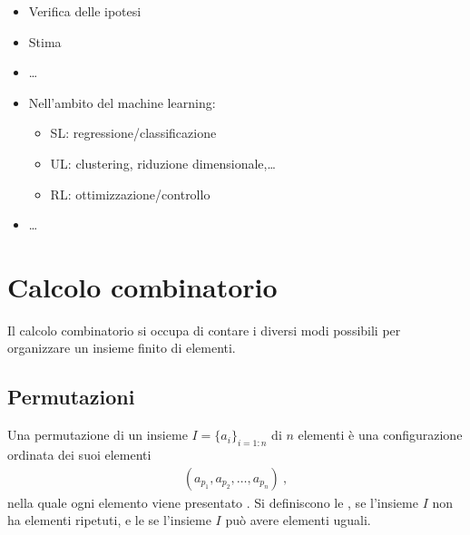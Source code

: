 \documentclass[letterpaper,10pt,italian]{jupyterBook}
\begin{document}
\sphinxAtStartPar
{}
\begin{itemize}
\item {} 
\sphinxAtStartPar
Verifica delle ipotesi

\item {} 
\sphinxAtStartPar
Stima

\item {} 
\sphinxAtStartPar
…

\item {} 
\sphinxAtStartPar
Nell’ambito del machine learning:
\begin{itemize}
\item {} 
\sphinxAtStartPar
SL: regressione/classificazione

\item {} 
\sphinxAtStartPar
UL: clustering, riduzione dimensionale,…

\item {} 
\sphinxAtStartPar
RL: ottimizzazione/controllo

\end{itemize}

\item {} 
\sphinxAtStartPar
…

\end{itemize}

\sphinxstepscope


\section{Calcolo combinatorio}
\label{\detokenize{ch/statistics/combinatorics:calcolo-combinatorio}}\label{\detokenize{ch/statistics/combinatorics:math-hs-statistics-combinatorics}}\label{\detokenize{ch/statistics/combinatorics::doc}}
\sphinxAtStartPar
Il calcolo combinatorio si occupa di contare i diversi modi possibili per organizzare un insieme finito di elementi.


\subsection{Permutazioni}
\label{\detokenize{ch/statistics/combinatorics:permutazioni}}
\sphinxAtStartPar
Una permutazione di un insieme \(I = \{ a_i \}_{i=1:n}\) di \(n\) elementi è una configurazione ordinata dei suoi elementi
\begin{equation*}
\begin{split}\left( a_{p_1}, a_{p_2}, \dots, a_{p_n} \right) \ ,\end{split}
\end{equation*}
\sphinxAtStartPar
nella quale ogni elemento viene presentato . Si definiscono le , se l’insieme \(I\) non ha elementi ripetuti, e le  se l’insieme \(I\) può avere elementi uguali.
\end{document}

